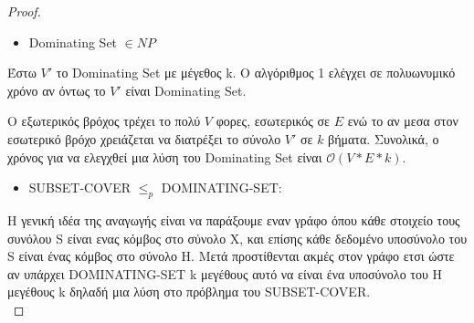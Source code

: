 \documentclass{article}
\renewcommand{\O}{\mathcal{O}}
\begin{document}
	\begin{proof}
	\begin{itemize}
		\item Dominating Set $\in NP$\\
	\end{itemize}	
		Έστω $V'$ το Dominating Set με μέγεθος k. Ο αλγόριθμος 1 ελέγχει σε πολυωνυμικό χρόνο
		αν όντως το $V'$ είναι Dominating Set.
		
		Ο εξωτερικός βρόχος τρέχει το πολύ $V$ φορες, εσωτερικός σε $Ε$ ενώ το αν μεσα στον
		εσωτερικό βρόχο χρειάζεται να διατρέξει το σύνολο $V'$ σε $k$ βήματα. Συνολικά, ο χρόνος για να ελεγχθεί μια λύση του Dominating Set
		είναι $\O(V*E*k)$.
	\begin{itemize}		
		\item SUBSET-COVER $\leq _p$ DOMINATING-SET:\\
	\end{itemize}		
		Η γενική ιδέα της αναγωγής είναι να παράξουμε εναν γράφο όπου κάθε στοιχείο τους συνόλου S είναι ενας κόμβος
		στο σύνολο X, και επίσης κάθε δεδομένο υποσύνολο του S είναι ένας κόμβος στο σύνολο H. Μετά προστίθενται ακμές στον
		γράφο ετσι ώστε αν υπάρχει DOMINATING-SET k μεγέθους αυτό να είναι ένα υποσύνολο του H μεγέθους k δηλαδή μια λύση στο
		πρόβλημα του SUBSET-COVER.\\
		  

\end{proof}
\end{document}
